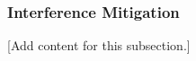 
\subsubsection{Interference Mitigation}
\label{subsubsec:design_2_3_4_interference_mitigation}

[Add content for this subsection.]
